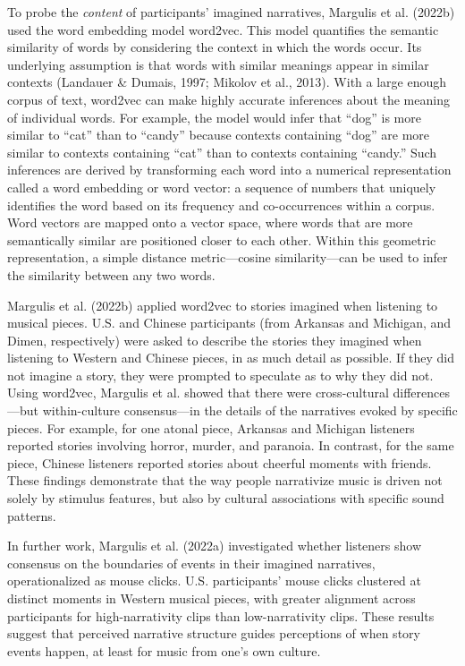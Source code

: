 \documentclass[12pt,twoside]{reedthesis}
\begin{document}
To probe the \emph{content} of participants’ imagined narratives, Margulis et al. (2022b) used the word embedding model word2vec. This model quantifies the semantic similarity of words by considering the context in which the words occur. Its underlying assumption is that words with similar meanings appear in similar contexts (Landauer \& Dumais, 1997; Mikolov et al., 2013). With a large enough corpus of text, word2vec can make highly accurate inferences about the meaning of individual words. For example, the model would infer that “dog” is more similar to “cat” than to “candy” because contexts containing “dog” are more similar to contexts containing “cat” than to contexts containing “candy.” Such inferences are derived by transforming each word into a numerical representation called a word embedding or word vector: a sequence of numbers that uniquely identifies the word based on its frequency and co-occurrences within a corpus. Word vectors are mapped onto a vector space, where words that are more semantically similar are positioned closer to each other. Within this geometric representation, a simple distance metric—cosine similarity—can be used to infer the similarity between any two words. 

Margulis et al. (2022b) applied word2vec to stories imagined when listening to musical pieces. U.S. and Chinese participants (from Arkansas and Michigan, and Dimen, respectively) were asked to describe the stories they imagined when listening to Western and Chinese pieces, in as much detail as possible. If they did not imagine a story, they were prompted to speculate as to why they did not. Using word2vec, Margulis et al. showed that there were cross-cultural differences—but within-culture consensus—in the details of the narratives evoked by specific pieces. For example, for one atonal piece, Arkansas and Michigan listeners reported stories involving horror, murder, and paranoia. In contrast, for the same piece, Chinese listeners reported stories about cheerful moments with friends. These findings demonstrate that the way people narrativize music is driven not solely by stimulus features, but also by cultural associations with specific sound patterns. 

In further work, Margulis et al. (2022a) investigated whether listeners show consensus on the boundaries of events in their imagined narratives, operationalized as mouse clicks. U.S. participants’ mouse clicks clustered at distinct moments in Western musical pieces, with greater alignment across participants for high-narrativity clips than low-narrativity clips. These results suggest that perceived narrative structure guides perceptions of when story events happen, at least for music from one’s own culture.
\end{document}

